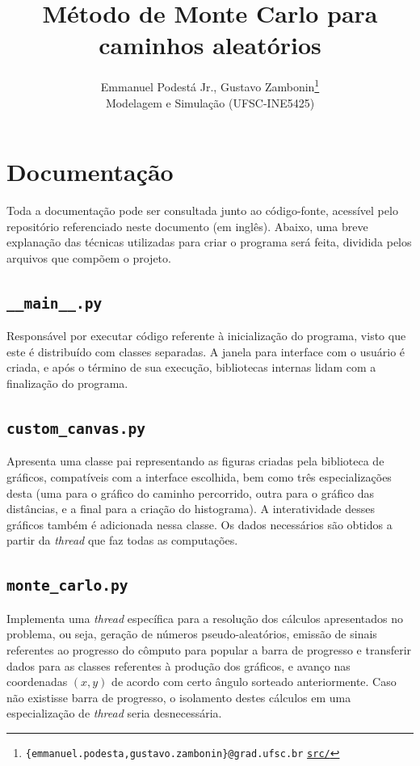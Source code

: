 \documentclass{article}
\title{\textbf{Método de Monte Carlo para caminhos aleatórios}}
\author{Emmanuel Podestá Jr., Gustavo Zambonin\thanks{
        \texttt{\{emmanuel.podesta,gustavo.zambonin\}@grad.ufsc.br} \hfill
        \texttt{\href{https://github.com/zambonin/ufsc-ine5425}{src/}}
    } \\
    \small{Modelagem e Simulação (UFSC-INE5425)}
}
\date{}
\begin{document}
\maketitle

\section{Documentação}

Toda a documentação pode ser consultada junto ao código-fonte, acessível pelo
repositório referenciado neste documento (em inglês). Abaixo, uma breve
explanação das técnicas utilizadas para criar o programa será feita, dividida
pelos arquivos que compõem o projeto.

\subsection{\texttt{\_\_main\_\_.py}}

Responsável por executar código referente à inicialização do programa, visto
que este é distribuído com classes separadas. A janela para interface com o
usuário é criada, e após o término de sua execução, bibliotecas internas lidam
com a finalização do programa.

\subsection{\texttt{custom\_canvas.py}}

Apresenta uma classe pai representando as figuras criadas pela biblioteca de
gráficos, compatíveis com a interface escolhida, bem como três especializações
desta (uma para o gráfico do caminho percorrido, outra para o gráfico das
distâncias, e a final para a criação do histograma). A interatividade desses
gráficos também é adicionada nessa classe. Os dados necessários são obtidos a
partir da \emph{thread} que faz todas as computações.

\subsection{\texttt{monte\_carlo.py}}

Implementa uma \emph{thread} específica para a resolução dos cálculos
apresentados no problema, ou seja, geração de números pseudo-aleatórios,
emissão de sinais referentes ao progresso do cômputo para popular a barra de
progresso e transferir dados para as classes referentes à produção dos
gráficos, e avanço nas coordenadas $(x, y)$ de acordo com certo ângulo sorteado
anteriormente.  Caso não existisse barra de progresso, o isolamento destes
cálculos em uma especialização de \emph{thread} seria desnecessária.
\end{document}
